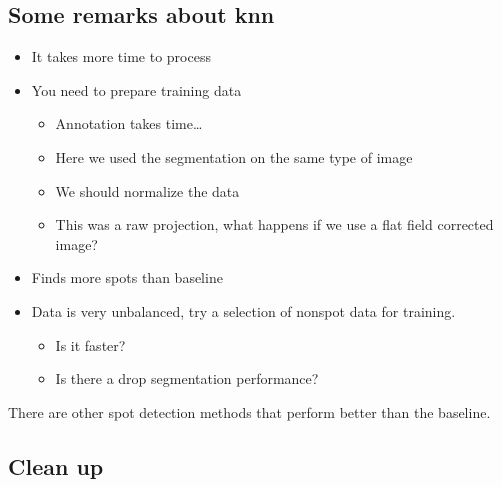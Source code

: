 \documentclass[letterpaper,10pt,english]{sphinxmanual}
\begin{document}
\subsection{Some remarks about k\sphinxhyphen{}nn}
\label{\detokenize{ML4NeutronImageSegmentation:some-remarks-about-k-nn}}\begin{itemize}
\item {} 
It takes more time to process

\item {} 
You need to prepare training data
\begin{itemize}
\item {} 
Annotation takes time…

\item {} 
Here we used the segmentation on the same type of image

\item {} 
We should normalize the data

\item {} 
This was a raw projection, what happens if we use a flat field corrected image?

\end{itemize}

\item {} 
Finds more spots than baseline

\item {} 
Data is very unbalanced, try a selection of non\sphinxhyphen{}spot data for training.
\begin{itemize}
\item {} 
Is it faster?

\item {} 
Is there a drop segmentation performance?

\end{itemize}

\end{itemize}

 There are other spot detection methods that perform better than the baseline.


\subsection{Clean up}
\label{\detokenize{ML4NeutronImageSegmentation:clean-up}}
\begin{sphinxVerbatim}[commandchars=\\\{\}]
   
\end{sphinxVerbatim}
\end{document}
